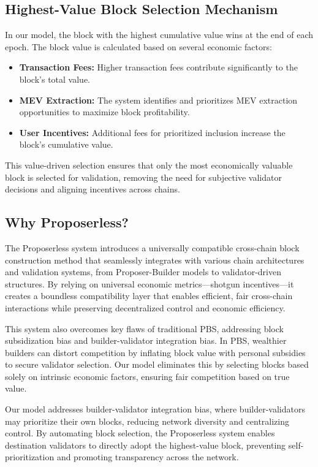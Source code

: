 \documentclass{article}
\begin{document}
\subsection*{Highest-Value Block Selection Mechanism}

In our model, the block with the highest cumulative value wins at the end of each epoch. The block value is calculated based on several economic factors:

\begin{itemize}
    \item \textbf{Transaction Fees:} Higher transaction fees contribute significantly to the block’s total value.
    \item \textbf{MEV Extraction:} The system identifies and prioritizes MEV extraction opportunities to maximize block profitability.
    \item \textbf{User Incentives:} Additional fees for prioritized inclusion increase the block’s cumulative value.
\end{itemize}

This value-driven selection ensures that only the most economically valuable block is selected for validation, removing the need for subjective validator decisions and aligning incentives across chains.

\subsection*{Why Proposerless?}

The Proposerless system introduces a universally compatible cross-chain block construction method that seamlessly integrates with various chain architectures and validation systems, from Proposer-Builder models to validator-driven structures. By relying on universal economic metrics—shotgun incentives—it creates a boundless compatibility layer that enables efficient, fair cross-chain interactions while preserving decentralized control and economic efficiency.

This system also overcomes key flaws of traditional PBS, addressing block subsidization bias and builder-validator integration bias. In PBS, wealthier builders can distort competition by inflating block value with personal subsidies to secure validator selection. Our model eliminates this by selecting blocks based solely on intrinsic economic factors, ensuring fair competition based on true value.

Our model addresses builder-validator integration bias, where builder-validators may prioritize their own blocks, reducing network diversity and centralizing control. By automating block selection, the Proposerless system enables destination validators to directly adopt the highest-value block, preventing self-prioritization and promoting transparency across the network.
\end{document}
